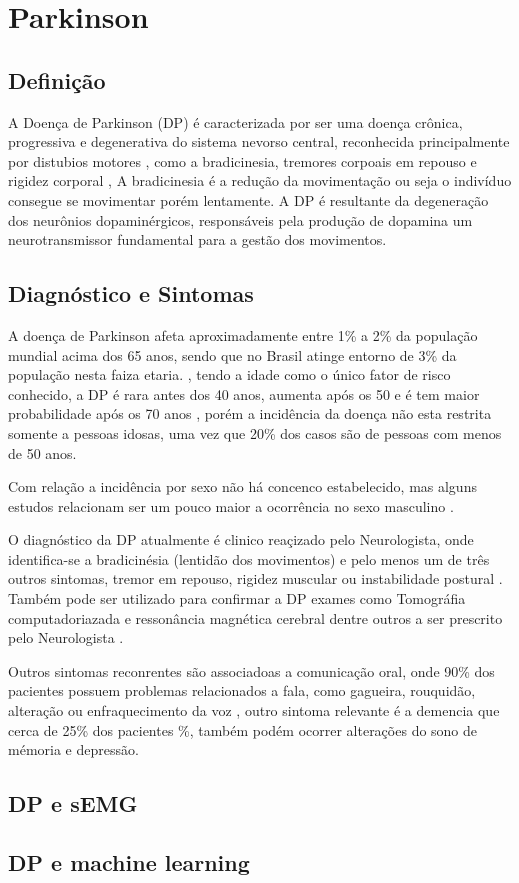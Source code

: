 \chapter{Parkinson}
\section{Definição}
A Doença de Parkinson (DP) é caracterizada por ser uma doença crônica, progressiva e degenerativa do sistema nevorso central, reconhecida principalmente por distubios motores \cite{souzametodos}, como a bradicinesia, tremores corpoais em repouso e rigidez corporal \cite{da2016aspectos}, A bradicinesia é a redução da movimentação ou seja o indivíduo consegue se movimentar porém lentamente. A DP é resultante da degeneração dos neurônios dopaminérgicos, responsáveis pela produção de dopamina um neurotransmissor fundamental para a gestão dos movimentos. 

\section{Diagnóstico e Sintomas}
A doença de Parkinson afeta aproximadamente entre 1\% a 2\% da população mundial acima dos 65 anos, sendo que no Brasil atinge entorno de 3\% da população nesta faiza etaria. \cite{magalhaes2009descobrindo}, tendo a idade como o único fator de risco conhecido, a DP é rara antes dos 40 anos, aumenta após os 50 e é tem maior probabilidade após os 70 anos \cite{peixinho2006alteraccoes}, porém a incidência da doença não esta restrita somente a pessoas idosas, uma vez que 20\% dos casos são de pessoas com menos de 50 anos. \cite{gago2014manual}

Com relação a incidência por sexo não há concenco estabelecido, mas alguns estudos relacionam ser um pouco maior a ocorrência no sexo masculino \cite{peixinho2006alteraccoes}.

O diagnóstico da DP atualmente é clinico reaçizado pelo Neurologista, onde identifica-se a bradicinésia (lentidão dos movimentos) e pelo menos um de três outros sintomas, tremor em repouso, rigidez muscular ou instabilidade postural \cite{gago2014manual}. Também pode ser utilizado para confirmar a DP exames como Tomográfia computadoriazada e ressonância magnética cerebral dentre outros a ser prescrito pelo Neurologista \cite{gago2014manual}.

Outros sintomas reconrentes são associadoas a comunicação oral, onde 90\% dos pacientes possuem problemas relacionados a fala, como gagueira, rouquidão, alteração ou enfraquecimento da voz \cite{zarzur2010laryngeal}, outro sintoma relevante é a demencia que cerca de 25\% dos pacientes \cite{pamplona1996demencia}\%, também podém ocorrer alterações do sono de mémoria e depressão\cite{barbosa2005parkinsons}.

\section{DP e sEMG}


\section{DP e machine learning}